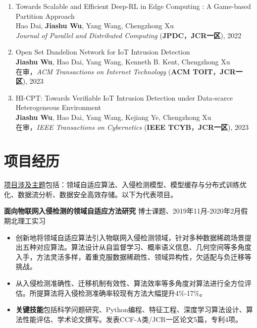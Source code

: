 \documentclass[UTF8,letterpaper,11pt]{article}
\begin{document}
\begin{enumerate}
  \item Towards Scalable and Efficient Deep-RL in Edge Computing : A Game-based Partition Approach\\
  Hao Dai, \textbf{Jiashu Wu}, Yang Wang\textsuperscript{\Letter}, Chengzhong Xu\\
  \textit{Journal of Parallel and Distributed Computing} (\textbf{JPDC}，\textbf{JCR一区}), 2022

  \item Open Set Dandelion Network for IoT Intrusion Detection\\
  \textbf{Jiashu Wu}, Hao Dai, Yang Wang\textsuperscript{\Letter}, Kenneth B. Kent, Chengzhong Xu\\
  在审，\textit{ACM Transactions on Internet Technology} (\textbf{ACM TOIT}，\textbf{JCR一区}), 2023
  
  \item HI-CPT: Towards Verifiable IoT Intrusion Detection under Data-scarce Heterogeneous Environment\\
  \textbf{Jiashu Wu}, Hao Dai, Yang Wang\textsuperscript{\Letter}, Kejiang Ye, Chengzhong Xu\\
  在审，\textit{IEEE Transactions on Cybernetics} (\textbf{IEEE TCYB}，\textbf{JCR一区}), 2023
\end{enumerate}




\section{\textbf{项目经历}}

\underline{项目涉及主题}包括：领域自适应算法、入侵检测模型、模型缓存与分布式训练优化、数据流分析、数据安全高效存储。以下为代表项目。

\vspace{2mm}

\textbf{面向物联网入侵检测的领域自适应方法研究} \hfill 博士课题、2019年11月-2020年2月假期北理工实习

\begin{itemize}
  \setlength\itemsep{1.8pt}
  \item 创新地将领域自适应算法引入物联网入侵检测领域，针对多种数据稀疏场景提出五种对应算法。算法设计从自监督学习、概率语义信息、几何空间等多角度入手，方法灵活多样，着重克服数据稀疏性、领域异构性，欠适配与负迁移等挑战。
  \item 从入侵检测准确性、迁移机制有效性、算法效率等多角度对算法进行全方位评估。所提算法将入侵检测准确率较现有方法大幅提升4\%-17\%。
  \item \textbf{关键技能}包括科学问题研究、Python编程、特征工程、深度学习算法设计、算法性能评估、学术论文撰写。发表CCF-A类/JCR一区论文5篇，专利4项。
\end{itemize}
\end{document}
